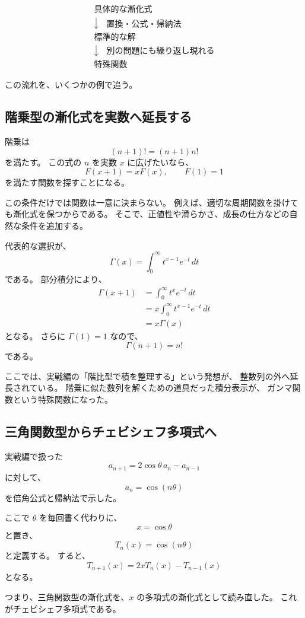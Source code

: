 \[
\begin{array}{c}
\text{具体的な漸化式}\\
\downarrow\quad\text{置換・公式・帰納法}\\
\text{標準的な解}\\
\downarrow\quad\text{別の問題にも繰り返し現れる}\\
\text{特殊関数}
\end{array}
\]

この流れを、いくつかの例で追う。

\subsection{階乗型の漸化式を実数へ延長する}

階乗は
\[
  (n+1)!=(n+1)n!
\]
を満たす。
この式の $n$ を実数 $x$ に広げたいなら、
\[
  F(x+1)=xF(x),\qquad F(1)=1
\]
を満たす関数を探すことになる。

この条件だけでは関数は一意に決まらない。
例えば、適切な周期関数を掛けても漸化式を保つからである。
そこで、正値性や滑らかさ、成長の仕方などの自然な条件を追加する。

代表的な選択が、
\[
  \Gamma(x)=\int_0^\infty t^{x-1}e^{-t}\,dt
\]
である。
部分積分により、
\[
\begin{aligned}
  \Gamma(x+1)
  &=\int_0^\infty t^xe^{-t}\,dt\\
  &=x\int_0^\infty t^{x-1}e^{-t}\,dt\\
  &=x\Gamma(x)
\end{aligned}
\]
となる。
さらに $\Gamma(1)=1$ なので、
\[
  \Gamma(n+1)=n!
\]
である。

ここでは、実戦編の「階比型で積を整理する」という発想が、
整数列の外へ延長されている。
階乗に似た数列を解くための道具だった積分表示が、
ガンマ関数という特殊関数になった。

\subsection{三角関数型からチェビシェフ多項式へ}

実戦編で扱った
\[
  a_{n+1}=2\cos\theta\,a_n-a_{n-1}
\]
に対して、
\[
  a_n=\cos(n\theta)
\]
を倍角公式と帰納法で示した。

ここで $\theta$ を毎回書く代わりに、
\[
  x=\cos\theta
\]
と置き、
\[
  T_n(x)=\cos(n\theta)
\]
と定義する。
すると、
\[
  T_{n+1}(x)=2xT_n(x)-T_{n-1}(x)
\]
となる。

つまり、三角関数型の漸化式を、$x$ の多項式の漸化式として読み直した。
これがチェビシェフ多項式である。

